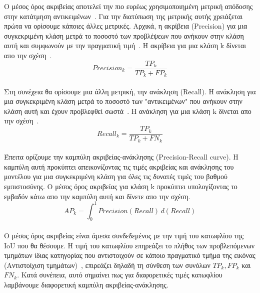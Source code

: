 \documentclass[12pt]{article}
\numberwithin{equation}{section}
\begin{document}
Ο μέσος όρος ακριβείας αποτελεί την πιο ευρέως χρησιμοποιημένη μετρική απόδοσης στην κατάτμηση αντικειμένων~\cite{Kookna2022Segmentation}. Για την διατύπωση της μετρικής αυτής χρειάζεται πρώτα να ορίσουμε κάποιες άλλες μετρικές. Αρχικά, η ακρίβεια (Precision) για μια συγκεκριμένη κλάση μετρά το ποσοστό των προβλέψεων που ανήκουν στην κλάση αυτή και συμφωνούν με την πραγματική τιμή~\cite{Bex2021MulticlassMetrics}. Η ακρίβεια για μια κλάση k δίνεται απο την σχέση~\cite{grandini2020metricsmulticlassclassificationoverview}. \\

\begin{equation}
Precision_k = \frac{TP_k}{TP_k + FP_k}
\end{equation}\\

\noindent Στη συνέχεια θα ορίσουμε μια άλλη μετρική, την ανάκληση (Recall). Η ανάκληση για μια συγκεκριμένη κλάση μετρά το ποσοστό των "αντικειμένων" που ανήκουν στην κλάση αυτή και έχουν προβλεφθεί σωστά~\cite{Bex2021MulticlassMetrics}. Η ανάκληση για μια κλάση k δίνεται απο την σχέση~\cite{grandini2020metricsmulticlassclassificationoverview}.\\

\begin{equation}
Recall_k = \frac{TP_k}{TP_k + FN_k}
\end{equation}\\

Έπειτα ορίζουμε την καμπύλη ακριβείας-ανάκλησης (Precision-Recall curve). Η καμπύλη αυτή προκύπτει απεικονίζοντας τις τιμές ακριβείας και ανάκλησης του μοντέλου για μια συγκεκριμένη κλάση για όλες τις δυνατές τιμές του βαθμού εμπιστοσύνης. Ο μέσος όρος ακριβείας για κλάση k προκύπτει υπολογίζοντας το εμβαδόν κάτω απο την καμπύλη αυτή και δίνετε απο την σχέση.\\

\begin{equation}
AP_k = \int_{0}^{1} Precision(Recall) \, d(Recall)
\end{equation} \\

Ο μέσος όρος ακριβείας είναι άμεσα συνδεδεμένος με την τιμή του κατωφλίου της IoU που θα θέσουμε. Η τιμή του κατωφλίου επηρεάζει το πλήθος των προβλεπόμενων τμημάτων ίδιας κατηγορίας που αντιστοιχούν σε κάποιο πραγματικό τμήμα της εικόνας (Αντιστοίχιση τμημάτων)~\cite{Kirillov_2019_CVPR}, επιρεάζει δηλαδή τη σύνθεση των συνόλων \(TP_k, FP_k\) και \(FN_k\). Κατά συνέπεια, αυτό σημαίνει πως για διαφορετικές τιμές κατωφλίου λαμβάνουμε διαφορετική καμπύλη ακριβείας-ανάκλησης. \\
\end{document}
